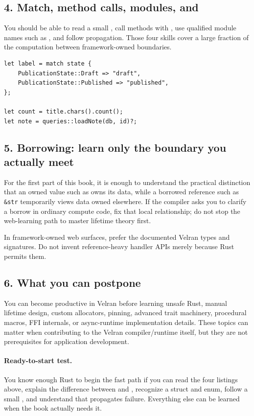 \subsection*{4. Match, method calls, modules, and }

You should be able to read a small , call methods with , use qualified module names such as , and follow  propagation. Those four skills cover a large fraction of the computation between framework-owned boundaries.

\begin{lstlisting}[language=Velran]
let label = match state {
    PublicationState::Draft => "draft",
    PublicationState::Published => "published",
};

let count = title.chars().count();
let note = queries::loadNote(db, id)?;
\end{lstlisting}

\subsection*{5. Borrowing: learn only the boundary you actually meet}

For the first part of this book, it is enough to understand the practical distinction that an owned value such as  owns its data, while a borrowed reference such as \texttt{\&str} temporarily views data owned elsewhere. If the compiler asks you to clarify a borrow in ordinary compute code, fix that local relationship; do not stop the web-learning path to master lifetime theory first.

In framework-owned web surfaces, prefer the documented Velran types and signatures. Do not invent reference-heavy handler APIs merely because Rust permits them.

\subsection*{6. What you can postpone}

You can become productive in Velran before learning unsafe Rust, manual lifetime design, custom allocators, pinning, advanced trait machinery, procedural macros, FFI internals, or async-runtime implementation details. These topics can matter when contributing to the Velran compiler/runtime itself, but they are not prerequisites for application development.

\paragraph{Ready-to-start test.}
You know enough Rust to begin the fast path if you can read the four listings above, explain the difference between  and , recognize a struct and enum, follow a small , and understand that  propagates failure. Everything else can be learned when the book actually needs it.

